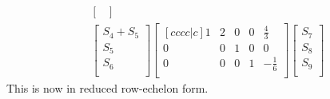 \documentclass{report}
\theoremstyle{plain}
\theoremstyle{definition}
\theoremstyle{plain}
\begin{document}
\begin{align*}
\begin{bmatrix}
\end{bmatrix}\\
\begin{bmatrix}
S_4 + S_5\\
S_5\\
S_6\\
\end{bmatrix}
\begin{bmatrix}[cccc|c]
1 & 2 & 0 & 0 & \frac{4}{3}\\
0 & 0 & 1 & 0 & 0\\
0 & 0 & 0 & 1 & -\frac{1}{6}\\
\end{bmatrix}
\begin{bmatrix}
S_7\\
S_8\\
S_9\\
\end{bmatrix}
\end{align*}
This is now in reduced row-echelon form.\\
\\
\end{document}

